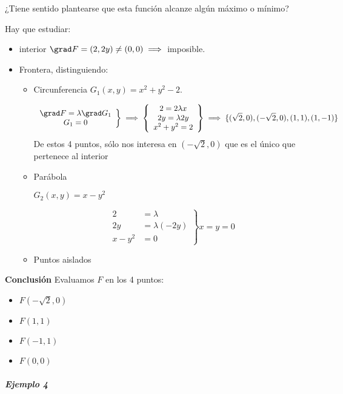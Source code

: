 ¿Tiene sentido plantearse que esta función alcanze algún máximo o mínimo? 
 
 
 Hay que estudiar:
 \begin{itemize}
 \item interior $\grad F = (2,2y) \neq (0,0) \implies$ imposible.
 \item Frontera, distinguiendo:
 \begin{itemize}
 \item Circunferencia
 	$G_1(x,y) = x^2+y^2-2$.
 	
 	\[\left.\begin{array}{cc}
 	\grad F = \lambda \grad G_1\\
 	G_1 = 0\end{array} \right\}\implies \left\{\begin{array}{c}
 	2 = 2\lambda x\\
 	2y = \lambda 2y\\
 	x^2+y^2=2\end{array} \right\} \implies \{(\sqrt{2},0),(-\sqrt{2},0),(1,1),(1,-1)\} \]
 	De estos 4 puntos, sólo nos interesa en $(-\sqrt{2},0)$ que es el único que pertenece al interior
 \item Parábola
 
 $G_2(x,y) = x-y^2$
 
 \[\left.\begin{array}{cc}
 2 &= \lambda\\
 2y &= \lambda (-2y)\\
 x-y^2 &=0\end{array}\right\} x=y=0\]
 \item Puntos aislados
 \end{itemize}
 \end{itemize}

\textbf{Conclusión} Evaluamos $F$ en los 4 puntos:

\begin{itemize}
\item $F(-\sqrt{2},0)$
\item $F(1,1)$
\item $F(-1,1)$
\item $F(0,0)$
\end{itemize}

\subparagraph{Ejemplo 4}

